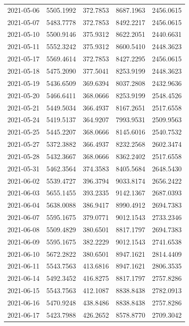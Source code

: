 \begin{footnotesize}
\begin{longtable}{lllll}
2021-05-06 & 5505.1992 & 372.7853 & 8687.1963 & 2456.0615 \\
2021-05-07 & 5483.7778 & 372.7853 & 8492.2217 & 2456.0615 \\
2021-05-10 & 5500.9146 & 375.9312 & 8622.2051 & 2440.6631 \\
2021-05-11 & 5552.3242 & 375.9312 & 8600.5410 & 2448.3623 \\
2021-05-17 & 5569.4614 & 372.7853 & 8427.2295 & 2456.0615 \\
2021-05-18 & 5475.2090 & 377.5041 & 8253.9199 & 2448.3623 \\
2021-05-19 & 5436.6509 & 369.6394 & 8037.2808 & 2432.9636 \\
2021-05-20 & 5466.6411 & 368.0666 & 8253.9199 & 2548.4526 \\
2021-05-21 & 5449.5034 & 366.4937 & 8167.2651 & 2517.6558 \\
2021-05-24 & 5419.5137 & 364.9207 & 7993.9531 & 2509.9563 \\
2021-05-25 & 5445.2207 & 368.0666 & 8145.6016 & 2540.7532 \\
2021-05-27 & 5372.3882 & 366.4937 & 8232.2568 & 2602.3474 \\
2021-05-28 & 5432.3667 & 368.0666 & 8362.2402 & 2517.6558 \\
2021-05-31 & 5462.3564 & 374.3583 & 8405.5684 & 2648.5430 \\
2021-06-02 & 5539.4727 & 396.3794 & 9033.8174 & 2656.2422 \\
2021-06-03 & 5655.1455 & 393.2335 & 9142.1367 & 2687.0393 \\
2021-06-04 & 5638.0088 & 386.9417 & 8990.4912 & 2694.7383 \\
2021-06-07 & 5595.1675 & 379.0771 & 9012.1543 & 2733.2346 \\
2021-06-08 & 5509.4829 & 380.6501 & 8817.1797 & 2694.7383 \\
2021-06-09 & 5595.1675 & 382.2229 & 9012.1543 & 2741.6538 \\
2021-06-10 & 5672.2822 & 380.6501 & 8947.1621 & 2814.4409 \\
2021-06-11 & 5543.7563 & 413.6816 & 8947.1621 & 2806.3535 \\
2021-06-14 & 5492.3452 & 416.8275 & 8817.1797 & 2757.8286 \\
2021-06-15 & 5543.7563 & 412.1087 & 8838.8438 & 2782.0913 \\
2021-06-16 & 5470.9248 & 438.8486 & 8838.8438 & 2757.8286 \\
2021-06-17 & 5423.7988 & 426.2652 & 8578.8770 & 2709.3042 \\

\end{longtable}
\end{footnotesize}
